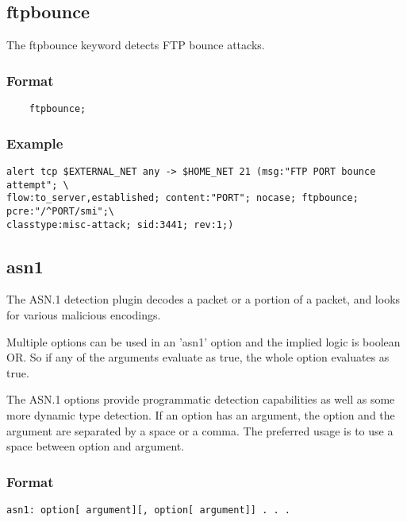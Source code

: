 \documentclass[english]{report}
\begin{document}
\subsection{ftpbounce}

The ftpbounce keyword detects FTP bounce attacks.

\subsubsection{Format}
                                                                                
\begin{verbatim}
	ftpbounce;
\end{verbatim}

\subsubsection{Example}
\begin{verbatim}
alert tcp $EXTERNAL_NET any -> $HOME_NET 21 (msg:"FTP PORT bounce attempt"; \
flow:to_server,established; content:"PORT"; nocase; ftpbounce; pcre:"/^PORT/smi";\
classtype:misc-attack; sid:3441; rev:1;)
\end{verbatim}

\subsection{asn1\label{asn1}}

The ASN.1 detection plugin decodes a packet or a portion of a packet, and looks
for various malicious encodings.

Multiple options can be used in an 'asn1' option and the implied logic is
boolean OR.  So if any of the arguments evaluate as true, the whole option
evaluates as true.

The ASN.1 options provide programmatic detection capabilities as well as some
more dynamic type detection.  If an option has an argument, the option and the
argument are separated by a space or a comma.  The preferred usage is to use a
space between option and argument.

\subsubsection{Format}

\begin{verbatim}
asn1: option[ argument][, option[ argument]] . . . 
\end{verbatim}
\end{document}
